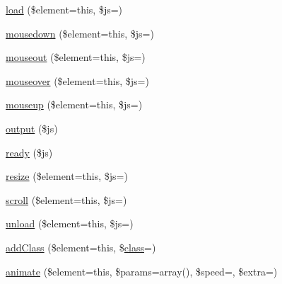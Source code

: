 \begin{DoxyCompactItemize}
\item 
\mbox{\hyperlink{class_c_i___javascript_a5e0d3ce786a91561730aa9610b811f67}{load}} (\$element=\textquotesingle{}this\textquotesingle{}, \$js=\textquotesingle{}\textquotesingle{})
\item 
\mbox{\hyperlink{class_c_i___javascript_afa625106ad51c2f80ccfadf94981041d}{mousedown}} (\$element=\textquotesingle{}this\textquotesingle{}, \$js=\textquotesingle{}\textquotesingle{})
\item 
\mbox{\hyperlink{class_c_i___javascript_ab2d069b9fbd0500e0f514e9ec5dc94e1}{mouseout}} (\$element=\textquotesingle{}this\textquotesingle{}, \$js=\textquotesingle{}\textquotesingle{})
\item 
\mbox{\hyperlink{class_c_i___javascript_af54e0f954a0bb3983011578c848faf48}{mouseover}} (\$element=\textquotesingle{}this\textquotesingle{}, \$js=\textquotesingle{}\textquotesingle{})
\item 
\mbox{\hyperlink{class_c_i___javascript_a31b2b5c28657895274f5658517a2342a}{mouseup}} (\$element=\textquotesingle{}this\textquotesingle{}, \$js=\textquotesingle{}\textquotesingle{})
\item 
\mbox{\hyperlink{class_c_i___javascript_a95bc25e9063b14d257e97e4b205073ba}{output}} (\$js)
\item 
\mbox{\hyperlink{class_c_i___javascript_a00997e6137ed7dc0de0159ed143a107b}{ready}} (\$js)
\item 
\mbox{\hyperlink{class_c_i___javascript_a972b62f88e96fb29b179469e0d49329a}{resize}} (\$element=\textquotesingle{}this\textquotesingle{}, \$js=\textquotesingle{}\textquotesingle{})
\item 
\mbox{\hyperlink{class_c_i___javascript_acb749f777082c90c2b46eb1c367522dc}{scroll}} (\$element=\textquotesingle{}this\textquotesingle{}, \$js=\textquotesingle{}\textquotesingle{})
\item 
\mbox{\hyperlink{class_c_i___javascript_abe5e3762033021416ab5c4d0dce993bf}{unload}} (\$element=\textquotesingle{}this\textquotesingle{}, \$js=\textquotesingle{}\textquotesingle{})
\item 
\mbox{\hyperlink{class_c_i___javascript_ab624b7e1064cc514288eedc7ed5f121f}{add\+Class}} (\$element=\textquotesingle{}this\textquotesingle{}, \$\mbox{\hyperlink{waiter_2olaporan_8php_a185c73c6507391d1eb38c776b68ce96d}{class}}=\textquotesingle{}\textquotesingle{})
\item 
\mbox{\hyperlink{class_c_i___javascript_a04c5fa4911b166171608bc2651b1b2df}{animate}} (\$element=\textquotesingle{}this\textquotesingle{}, \$params=array(), \$speed=\textquotesingle{}\textquotesingle{}, \$extra=\textquotesingle{}\textquotesingle{})

\end{DoxyCompactItemize}
